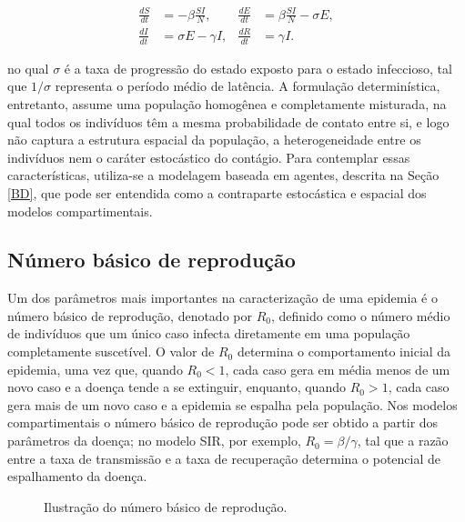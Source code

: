 \begin{equation}\label{eqn:seir}
\begin{aligned}
    \frac{dS}{dt} &= -\beta \frac{S I}{N}, & \frac{dE}{dt} &= \beta \frac{S I}{N} - \sigma E, \\
    \frac{dI}{dt} &= \sigma E - \gamma I, & \frac{dR}{dt} &= \gamma I.
\end{aligned}
\end{equation}

no qual $\sigma$ é a taxa de progressão do estado exposto para o estado infeccioso, tal que $1/\sigma$ representa o período médio de latência. A formulação determinística, entretanto, assume uma população homogênea e completamente misturada, na qual todos os indivíduos têm a mesma probabilidade de contato entre si, e logo não captura a estrutura espacial da população, a heterogeneidade entre os indivíduos nem o caráter estocástico do contágio. Para contemplar essas características, utiliza-se a modelagem baseada em agentes, descrita na Seção \ref{BD}, que pode ser entendida como a contraparte estocástica e espacial dos modelos compartimentais.

\subsection{Número básico de reprodução}

Um dos parâmetros mais importantes na caracterização de uma epidemia é o número básico de reprodução, denotado por $R_0$, definido como o número médio de indivíduos que um único caso infecta diretamente em uma população completamente suscetível. O valor de $R_0$ determina o comportamento inicial da epidemia, uma vez que, quando $R_0 < 1$, cada caso gera em média menos de um novo caso e a doença tende a se extinguir, enquanto, quando $R_0 > 1$, cada caso gera mais de um novo caso e a epidemia se espalha pela população. Nos modelos compartimentais o número básico de reprodução pode ser obtido a partir dos parâmetros da doença; no modelo SIR, por exemplo, $R_0 = \beta / \gamma$, tal que a razão entre a taxa de transmissão e a taxa de recuperação determina o potencial de espalhamento da doença.

\begin{figure}[H]
\centering
\caption{Ilustração do número básico de reprodução.}
\label{fig:r0}
\end{figure}

